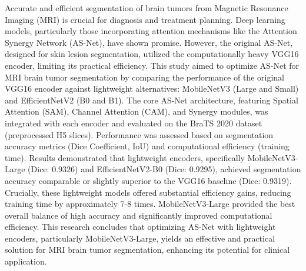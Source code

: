 \begin{summary}
Accurate and efficient segmentation of brain tumors from Magnetic Resonance Imaging (MRI) is crucial for diagnosis and treatment planning. Deep learning models, particularly those incorporating attention mechanisms like the Attention Synergy Network (AS-Net), have shown promise. However, the original AS-Net, designed for skin lesion segmentation, utilized the computationally heavy VGG16 encoder, limiting its practical efficiency. This study aimed to optimize AS-Net for MRI brain tumor segmentation by comparing the performance of the original VGG16 encoder against lightweight alternatives: MobileNetV3 (Large and Small) and EfficientNetV2 (B0 and B1). The core AS-Net architecture, featuring Spatial Attention (SAM), Channel Attention (CAM), and Synergy modules, was integrated with each encoder and evaluated on the BraTS 2020 dataset (preprocessed H5 slices). Performance was assessed based on segmentation accuracy metrics (Dice Coefficient, IoU) and computational efficiency (training time). Results demonstrated that lightweight encoders, specifically MobileNetV3-Large (Dice: 0.9326) and EfficientNetV2-B0 (Dice: 0.9295), achieved segmentation accuracy comparable or slightly superior to the VGG16 baseline (Dice: 0.9319). Crucially, these lightweight models offered substantial efficiency gains, reducing training time by approximately 7-8 times. MobileNetV3-Large provided the best overall balance of high accuracy and significantly improved computational efficiency. This research concludes that optimizing AS-Net with lightweight encoders, particularly MobileNetV3-Large, yields an effective and practical solution for MRI brain tumor segmentation, enhancing its potential for clinical application.
\end{summary}